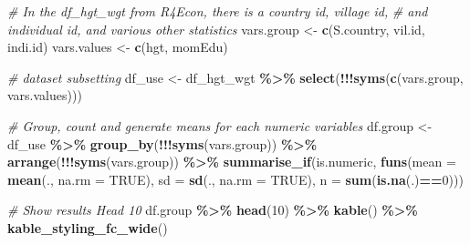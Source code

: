 \documentclass[
]{book}
\newenvironment{Shaded}{\begin{snugshade}}{\end{snugshade}}
\newcommand{\CommentTok}[1]{\textcolor[rgb]{0.56,0.35,0.01}{\textit{#1}}}
\newcommand{\DataTypeTok}[1]{\textcolor[rgb]{0.13,0.29,0.53}{#1}}
\newcommand{\DecValTok}[1]{\textcolor[rgb]{0.00,0.00,0.81}{#1}}
\newcommand{\KeywordTok}[1]{\textcolor[rgb]{0.13,0.29,0.53}{\textbf{#1}}}
\newcommand{\NormalTok}[1]{#1}
\newcommand{\OperatorTok}[1]{\textcolor[rgb]{0.81,0.36,0.00}{\textbf{#1}}}
\newcommand{\OtherTok}[1]{\textcolor[rgb]{0.56,0.35,0.01}{#1}}
\newcommand{\StringTok}[1]{\textcolor[rgb]{0.31,0.60,0.02}{#1}}
\begin{document}
\begin{Shaded}
\begin{Highlighting}[]
\CommentTok{\# In the df\_hgt\_wgt from R4Econ, there is a country id, village id,}
\CommentTok{\# and individual id, and various other statistics}
\NormalTok{vars.group \textless{}{-}}\StringTok{ }\KeywordTok{c}\NormalTok{(}\StringTok{\textquotesingle{}S.country\textquotesingle{}}\NormalTok{, }\StringTok{\textquotesingle{}vil.id\textquotesingle{}}\NormalTok{, }\StringTok{\textquotesingle{}indi.id\textquotesingle{}}\NormalTok{)}
\NormalTok{vars.values \textless{}{-}}\StringTok{ }\KeywordTok{c}\NormalTok{(}\StringTok{\textquotesingle{}hgt\textquotesingle{}}\NormalTok{, }\StringTok{\textquotesingle{}momEdu\textquotesingle{}}\NormalTok{)}

\CommentTok{\# dataset subsetting}
\NormalTok{df\_use \textless{}{-}}\StringTok{ }\NormalTok{df\_hgt\_wgt }\OperatorTok{\%\textgreater{}\%}\StringTok{ }\KeywordTok{select}\NormalTok{(}\OperatorTok{!!!}\KeywordTok{syms}\NormalTok{(}\KeywordTok{c}\NormalTok{(vars.group, vars.values)))}

\CommentTok{\# Group, count and generate means for each numeric variables}
\NormalTok{df.group \textless{}{-}}\StringTok{ }\NormalTok{df\_use }\OperatorTok{\%\textgreater{}\%}\StringTok{ }\KeywordTok{group\_by}\NormalTok{(}\OperatorTok{!!!}\KeywordTok{syms}\NormalTok{(vars.group)) }\OperatorTok{\%\textgreater{}\%}
\StringTok{            }\KeywordTok{arrange}\NormalTok{(}\OperatorTok{!!!}\KeywordTok{syms}\NormalTok{(vars.group)) }\OperatorTok{\%\textgreater{}\%}
\StringTok{            }\KeywordTok{summarise\_if}\NormalTok{(is.numeric,}
                         \KeywordTok{funs}\NormalTok{(}\DataTypeTok{mean =} \KeywordTok{mean}\NormalTok{(., }\DataTypeTok{na.rm =} \OtherTok{TRUE}\NormalTok{),}
                              \DataTypeTok{sd =} \KeywordTok{sd}\NormalTok{(., }\DataTypeTok{na.rm =} \OtherTok{TRUE}\NormalTok{),}
                              \DataTypeTok{n =} \KeywordTok{sum}\NormalTok{(}\KeywordTok{is.na}\NormalTok{(.)}\OperatorTok{==}\DecValTok{0}\NormalTok{)))}

\CommentTok{\# Show results Head 10}
\NormalTok{df.group }\OperatorTok{\%\textgreater{}\%}\StringTok{ }\KeywordTok{head}\NormalTok{(}\DecValTok{10}\NormalTok{) }\OperatorTok{\%\textgreater{}\%}
\StringTok{  }\KeywordTok{kable}\NormalTok{() }\OperatorTok{\%\textgreater{}\%}
\StringTok{  }\KeywordTok{kable\_styling\_fc\_wide}\NormalTok{()}
\end{Highlighting}
\end{Shaded}
\end{document}
